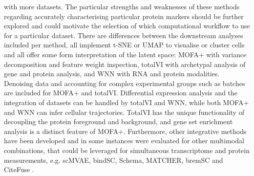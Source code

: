 \documentclass[times, twoside, watermark]{zHenriquesLab-StyleBioRxiv}
\begin{document}
with more datasets. The particular strengths and weaknesses of these methods regarding accurately characterising particular protein markers should be further explored and could motivate the selection of which computational workflow to use for a particular dataset. There are differences between the downstream analyses included per method, all implement t-SNE or UMAP to visualise or cluster cells and all offer some form interpretation of the latent space: MOFA+ with variance decomposition and feature weight inspection, totalVI with archetypal analysis of gene and protein analysis, and WNN with RNA and protein modalities. Denoising data and accounting for complex experimental groups such as batches are included for MOFA+ and totalVI. Differential expression analysis and the integration of datasets can be handled by totalVI and WNN, while both MOFA+ and WNN can infer cellular trajectories. TotalVI has the unique functionality of decoupling the protein foreground and background, and gene set enrichment analysis is a distinct feature of MOFA+. Furthermore, other integrative methods have been developed and in some instances were evaluated for other multimodal combinations, that could be leveraged for simultaneous transcriptome and protein measurements, e.g. scMVAE, bindSC, Schema, MATCHER, bremSC and CiteFuse \cite{Zuo2020,Dou2020,Singh2021,Welch2017,Wang2020,Kim2020}.
\end{document}

